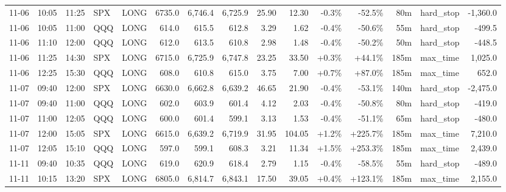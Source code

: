 \documentclass[11pt,a4paper,twoside]{article}
\begin{document}
\begin{landscape}
\begin{center}
\begin{longtable}{>{\color{txtmain}}l l l l l r r r r r r r r >{\color{txtmain}}l r}
11-06 & 10:05 & 11:25 & SPX & LONG & 6735.0 & 6,746.4 & 6,725.9 & 25.90 & 12.30 & \textcolor{lossred}{-0.3\%} & \textcolor{lossred}{-52.5\%} & 80m & hard\_stop & \textcolor{lossred}{-1,360.0} \\
11-06 & 10:05 & 11:00 & QQQ & LONG & 614.0 & 615.5 & 612.8 & 3.29 & 1.62 & \textcolor{lossred}{-0.4\%} & \textcolor{lossred}{-50.6\%} & 55m & hard\_stop & \textcolor{lossred}{-499.5} \\
11-06 & 11:10 & 12:00 & QQQ & LONG & 612.0 & 613.5 & 610.8 & 2.98 & 1.48 & \textcolor{lossred}{-0.4\%} & \textcolor{lossred}{-50.2\%} & 50m & hard\_stop & \textcolor{lossred}{-448.5} \\
11-06 & 11:25 & 14:30 & SPX & LONG & 6715.0 & 6,725.9 & 6,747.8 & 23.25 & 33.50 & \textcolor{wingreen}{+0.3\%} & \textcolor{wingreen}{+44.1\%} & 185m & max\_time & \textcolor{wingreen}{1,025.0} \\
11-06 & 12:25 & 15:30 & QQQ & LONG & 608.0 & 610.8 & 615.0 & 3.75 & 7.00 & \textcolor{wingreen}{+0.7\%} & \textcolor{wingreen}{+87.0\%} & 185m & max\_time & \textcolor{wingreen}{652.0} \\
11-07 & 09:40 & 12:00 & SPX & LONG & 6630.0 & 6,662.8 & 6,639.2 & 46.65 & 21.90 & \textcolor{lossred}{-0.4\%} & \textcolor{lossred}{-53.1\%} & 140m & hard\_stop & \textcolor{lossred}{-2,475.0} \\
11-07 & 09:40 & 11:00 & QQQ & LONG & 602.0 & 603.9 & 601.4 & 4.12 & 2.03 & \textcolor{lossred}{-0.4\%} & \textcolor{lossred}{-50.8\%} & 80m & hard\_stop & \textcolor{lossred}{-419.0} \\
11-07 & 11:00 & 12:05 & QQQ & LONG & 600.0 & 601.4 & 599.1 & 3.13 & 1.53 & \textcolor{lossred}{-0.4\%} & \textcolor{lossred}{-51.1\%} & 65m & hard\_stop & \textcolor{lossred}{-480.0} \\
11-07 & 12:00 & 15:05 & SPX & LONG & 6615.0 & 6,639.2 & 6,719.9 & 31.95 & 104.05 & \textcolor{wingreen}{+1.2\%} & \textcolor{wingreen}{+225.7\%} & 185m & max\_time & \textcolor{wingreen}{7,210.0} \\
11-07 & 12:05 & 15:10 & QQQ & LONG & 597.0 & 599.1 & 608.3 & 3.21 & 11.34 & \textcolor{wingreen}{+1.5\%} & \textcolor{wingreen}{+253.3\%} & 185m & max\_time & \textcolor{wingreen}{2,439.0} \\
11-11 & 09:40 & 10:35 & QQQ & LONG & 619.0 & 620.9 & 618.4 & 2.79 & 1.15 & \textcolor{lossred}{-0.4\%} & \textcolor{lossred}{-58.5\%} & 55m & hard\_stop & \textcolor{lossred}{-489.0} \\
11-11 & 10:15 & 13:20 & SPX & LONG & 6805.0 & 6,814.7 & 6,843.1 & 17.50 & 39.05 & \textcolor{wingreen}{+0.4\%} & \textcolor{wingreen}{+123.1\%} & 185m & max\_time & \textcolor{wingreen}{2,155.0} \\

\end{longtable}
\end{center}
\end{landscape}
\end{document}
